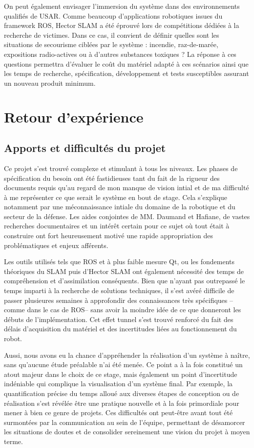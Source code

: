   On peut également envisager l'immersion du système dans des environnements qualifiés de \gls{USAR}.  
  Comme beaucoup d'applications robotiques issues du framework ROS, \gls{Hector SLAM} a été éprouvé lors de compétitions dédiées à la recherche de victimes. 
  Dans ce cas, il convient de définir quelles sont les situations de secourisme ciblées par le système : incendie, raz-de-marée, expositions radio-actives ou à d'autres substances toxiques ? 
  La réponse à ces questions permettra d'évaluer le coût du matériel adapté à ces scénarios ainsi que les temps de recherche, spécification, développement et tests susceptibles assurant un nouveau produit minimum. 
  
\section{Retour d'expérience}
  \subsection{Apports et difficultés du projet}
  
  Ce projet s'est trouvé complexe et stimulant à tous les niveaux. 
  Les phases de spécification du besoin ont été fastidieuses tant du fait de la rigueur des documents requis qu'au regard de mon manque de vision intial et de ma difficulté à me représenter ce que serait le système en bout de stage. 
  Cela s'explique notamment par une méconnaissance intiale du domaine de la robotique et du secteur de la défense.
  Les aides conjointes de MM. Daumand et Hafiane, de vastes recherches documentaires et un intérêt certain pour ce sujet où tout était à construire ont fort heureusement motivé une rapide appropriation des problématiques et enjeux afférents. 
  
  Les outils utilisés tels que ROS et à plus faible mesure Qt, ou les fondements théoriques du SLAM puis d'Hector SLAM ont également nécessité des temps de compréhension et d'assimilation conséquents. 
  Bien que n'ayant pas outrepassé le temps imparti à la recherche de solutions techniques, il s'est avéré difficile de passer plusieures semaines à approfondir des connaissances très spécifiques --comme dans le cas de ROS-- sans 
  avoir la moindre idée de ce que donneront les débuts de l'implémentation. 
  Cet effet tunnel s'est trouvé renforcé du fait des délais d'acquisition du matériel et des incertitudes liées au fonctionnement du robot. 
  
  Aussi, nous avons eu la chance d'appréhender la réalisation d'un système à naître, sans qu'aucune étude préalable n'ai été menée. 
  Ce point a à la fois constitué un atout majeur dans le choix de ce stage, mais également un point d'incertitude indéniable qui complique la visualisation d'un système final. 
  Par exemple, la quantification précise du temps alloué aux diverses étapes de conception ou de réalisation s'est révélée être une pratique nouvelle et à la fois primordiale pour mener à bien ce genre de projets. 
  Ces difficultés ont peut-être avant tout été surmontées par la communication au sein de l'équipe, permettant de désamorcer les situations de doutes et de consolider sereinement une vision du projet à moyen terme. 
  
